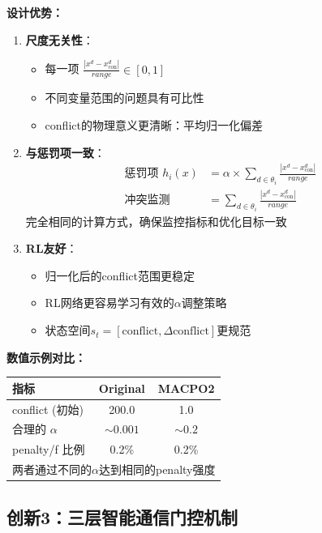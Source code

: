\documentclass[15pt,a3paper]{ctexart}
\begin{document}
\textbf{设计优势：}
\begin{enumerate}
    \item \textbf{尺度无关性}：
    \begin{itemize}
        \item 每一项 $\frac{|x^d - x_{\text{con}}^d|}{range} \in [0, 1]$
        \item 不同变量范围的问题具有可比性
        \item conflict的物理意义更清晰：平均归一化偏差
    \end{itemize}
    
    \item \textbf{与惩罚项一致}：
    \begin{align}
    \text{惩罚项 } h_i(x) &= \alpha \times \sum_{d \in \theta_i} \frac{|x^d - x_{\text{con}}^d|}{range} \\
    \text{冲突监测} &= \sum_{d \in \theta_i} \frac{|x^d - x_{\text{con}}^d|}{range}
    \end{align}
    完全相同的计算方式，确保监控指标和优化目标一致
    
    \item \textbf{RL友好}：
    \begin{itemize}
        \item 归一化后的conflict范围更稳定
        \item RL网络更容易学习有效的$\alpha$调整策略
        \item 状态空间$s_t = [\text{conflict}, \Delta \text{conflict}]$更规范
    \end{itemize}
\end{enumerate}

\textbf{数值示例对比：}
\begin{table}[h]
\centering
\begin{tabular}{|l|c|c|}
\hline
\textbf{指标} & \textbf{Original} & \textbf{MACPO2} \\
\hline
conflict (初始) & 200.0 & 1.0 \\
合理的 $\alpha$ & $\sim 0.001$ & $\sim 0.2$ \\
penalty/f 比例 & 0.2\% & 0.2\% \\
\hline
\multicolumn{3}{|c|}{两者通过不同的$\alpha$达到相同的penalty强度} \\
\hline
\end{tabular}
\end{table}

\subsection{创新3：三层智能通信门控机制}
\end{document}
